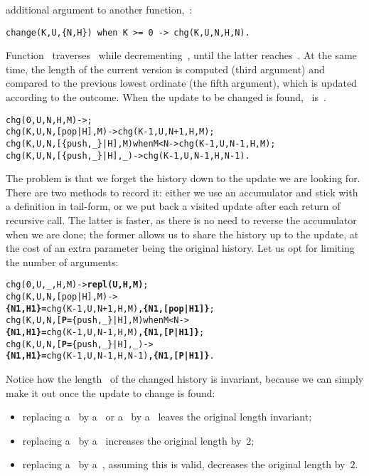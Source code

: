 additional argument to another function,~:
\begin{verbatim}
change(K,U,{N,H}) when K >= 0 -> chg(K,U,N,H,N).
\end{verbatim}
Function~ traverses~ while
decrementing~, until the latter reaches~. At the
same time, the length of the current version is computed (third
argument) and compared to the previous lowest ordinate (the fifth
argument), which is updated according to the outcome. When the update
to be changed is found, ~is~.
\begin{alltt}
chg(0,U,N,           H,M)          -> ;
chg(K,U,N,     [pop|H],M)          -> chg(K-1,U,N+1,H,M);
chg(K,U,N,[\{push,\_\}|H],M) when M<N -> chg(K-1,U,N-1,H,M);
chg(K,U,N,[\{push,\_\}|H],\_)          -> chg(K-1,U,N-1,H,N-1).
\end{alltt}
The problem is that we forget the history down to the update we are
looking for. There are two methods to record it: either we use an
accumulator and stick with a definition in tail\hyp{}form, or we put
back a visited update after each return of recursive call. The latter
is faster, as there is no need to reverse the accumulator when we are
done; the former allows us to share the history up to the update, at
the cost of an extra parameter being the original history. Let us opt
for limiting the number of arguments:
\begin{alltt}
chg(0,U,\_,             H,M)            -> \textbf{repl(U,H,M)};
chg(K,U,N,       [pop|H],M)            ->
             \textbf{\{N1,H1\} =} chg(K-1,U,N+1,H,  M)\textbf{, \{N1,[pop|H1]\}};
chg(K,U,N,[\textbf{P=}\{push,\_\}|H],M) when M < N -> 
             \textbf{\{N1,H1\} =} chg(K-1,U,N-1,H,  M)\textbf{, \{N1,  [P|H1]\}};
chg(K,U,N,[\textbf{P=}\{push,\_\}|H],\_)            ->
             \textbf{\{N1,H1\} =} chg(K-1,U,N-1,H,N-1)\textbf{, \{N1,  [P|H1]\}}.
\end{alltt}
Notice how the length~ of the changed history is
invariant, because we can simply make it out once the update to change
is found:
\begin{itemize}

  \item replacing a~ by a~ or
    a~ by a~ leaves the original length
    invariant;

  \item replacing a~ by a~ increases the
    original length by~\(2\);

  \item replacing a~ by a~, assuming this
    is valid, decreases the original length by~\(2\).

\end{itemize}
